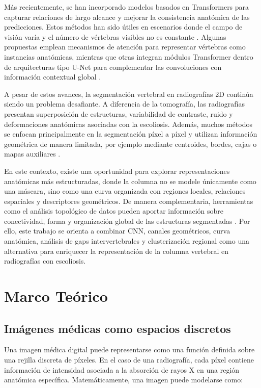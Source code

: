 \documentclass[conference]{IEEEtran}
\begin{document}
Más recientemente, se han incorporado modelos basados en Transformers para capturar relaciones de largo alcance y mejorar la consistencia anatómica de las predicciones. Estos métodos han sido útiles en escenarios donde el campo de visión varía y el número de vértebras visibles no es constante \cite{tao2022spine_transformers,you2023verteformer,zhang2023swinspine,li2024verformer}. Algunas propuestas emplean mecanismos de atención para representar vértebras como instancias anatómicas, mientras que otras integran módulos Transformer dentro de arquitecturas tipo U-Net para complementar las convoluciones con información contextual global \cite{you2022eg_trans3dunet,you2023verteformer,zhang2023swinspine}.

A pesar de estos avances, la segmentación vertebral en radiografías 2D continúa siendo un problema desafiante. A diferencia de la tomografía, las radiografías presentan superposición de estructuras, variabilidad de contraste, ruido y deformaciones anatómicas asociadas con la escoliosis. Además, muchos métodos se enfocan principalmente en la segmentación píxel a píxel y utilizan información geométrica de manera limitada, por ejemplo mediante centroides, bordes, cajas o mapas auxiliares \cite{you2022eg_trans3dunet,aydogdu2024centroid,li2024verformer}.

En este contexto, existe una oportunidad para explorar representaciones anatómicas más estructuradas, donde la columna no se modele únicamente como una máscara, sino como una curva organizada con regiones locales, relaciones espaciales y descriptores geométricos. De manera complementaria, herramientas como el análisis topológico de datos pueden aportar información sobre conectividad, forma y organización global de las estructuras segmentadas \cite{clough2020topological,hu2019topology}. Por ello, este trabajo se orienta a combinar CNN, canales geométricos, curva anatómica, análisis de gaps intervertebrales y clusterización regional como una alternativa para enriquecer la representación de la columna vertebral en radiografías con escoliosis.



\section{Marco Teórico}
\subsection{Imágenes médicas como espacios discretos}
Una imagen médica digital puede representarse como una función definida sobre una rejilla discreta de píxeles. En el caso de una radiografía, cada píxel contiene información de intensidad asociada a la absorción de rayos X en una región anatómica específica.
Matemáticamente, una imagen puede modelarse como:
\end{document}
